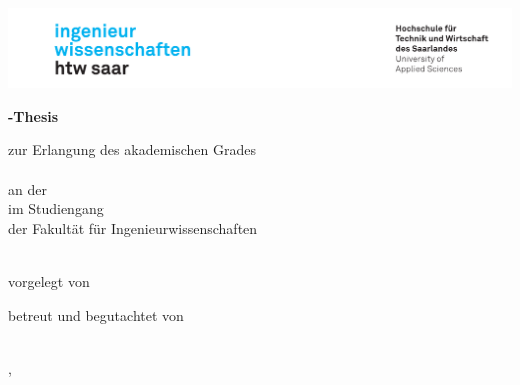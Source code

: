 \begin{titlepage}\linespread{1.5}\selectfont
\includegraphics[width=\linewidth]{Graphics/htwsaar_Logo_inwi_head_VF_4C_crop}
  \begin{center}
    \large  
    \hfill
    \vfill
    \begingroup
      \Large\bfseries\myDegreeType-Thesis 
    \endgroup
		
		\bigskip
		
    zur Erlangung des akademischen Grades \\
    \myDegree \\ 
    an der \myUni \\
    im Studiengang \myDegreeCourse \\
    der Fakultät für Ingenieurwissenschaften \\ 
    
  \vfill
	
  \begingroup
    \Large\bfseries\myTitle 
  \endgroup
	
	\bigskip
	
  vorgelegt von \\
  \myName
	
  \vfill
	
  betreut und begutachtet von \\
  \myFirstProf \\
  \mySecondProf 
	
  \vfill
	
  \myLocation, \myTime                   

    \end{center}       
\end{titlepage}   